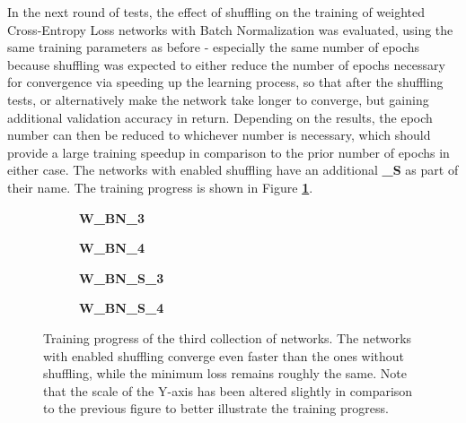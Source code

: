 In the next round of tests, the effect of shuffling on the training of weighted Cross-Entropy Loss networks with Batch Normalization was evaluated, using the same training parameters as before - especially the same number of epochs because shuffling was expected to either reduce the number of epochs necessary for convergence via speeding up the learning process, so that after the shuffling tests, or alternatively make the network take longer to converge, but gaining additional validation accuracy in return. Depending on the results, the epoch number can then be reduced to whichever number is necessary, which should provide a large training speedup in comparison to the prior number of epochs in either case. The networks with enabled shuffling have an additional \textbf{\_S} as part of their name. The training progress is shown in Figure \textbf{\ref{fig:weighted_batchnorm_shuffle_training}}.

\begin {figure}[!htb]
	\begin {subfigure}[b]{0.4\linewidth}
		\scalebox{0.65}{}
		\caption{\textbf{W\_BN\_3}}
	\end {subfigure}\hspace{1.75cm}
	\begin {subfigure}[b]{0.4\linewidth}
		\scalebox{0.65}{}
		\caption{\textbf{W\_BN\_4}}
	\end {subfigure}

	\begin {subfigure}[b]{0.4\linewidth}
		\scalebox{0.65}{}
		\caption{\textbf{W\_BN\_S\_3}}
	\end {subfigure}\hspace{1.75cm}
	\begin {subfigure}[b]{0.4\linewidth}
		\scalebox{0.65}{}
		\caption{\textbf{W\_BN\_S\_4}}
	\end {subfigure}

		\caption[Training progress of the third collection of networks.]{Training progress of the third collection of networks. The networks with enabled shuffling converge even faster than the ones without shuffling, while the minimum loss remains roughly the same. Note that the scale of the Y-axis has been altered slightly in comparison to the previous figure to better illustrate the training progress.}
		\label{fig:weighted_batchnorm_shuffle_training}
\end {figure}


